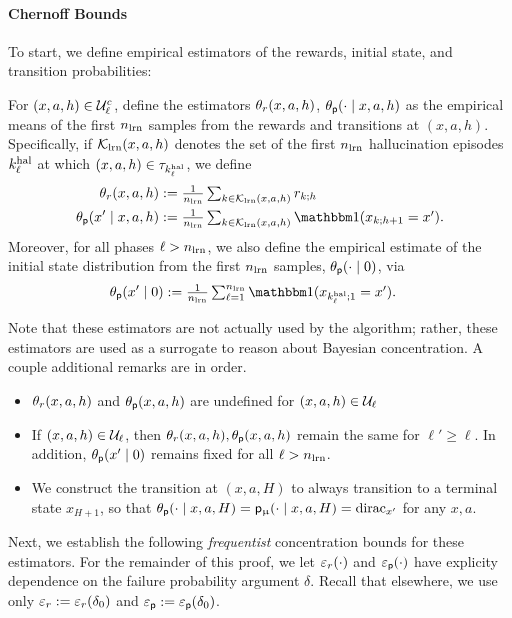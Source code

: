 \paragraph{Chernoff Bounds} To start, we define empirical estimators of the rewards, initial state, and transition probabilities:
\begin{definition}\label{defn:estimators} For $(x,a,h) \in \mathcal{U}_{\ell}^c$, define the estimators $\theta_r(x,a,h)$, $\theta_{\mathsf{p}}(\cdot \mid x,a,h)$  as the empirical means of the first $n_{\mathrm{lrn}}$ samples from the rewards and transitions at $(x,a,h)$. Specifically, if $\mathcal{K}_{\mathrm{lrn}}(x,a,h)$ denotes the set of the first $n_{\mathrm{lrn}}$ hallucination episodes $k^{\mathrm{hal}}_{\ell}$ at which $(x,a,h) \in \tau_{k^{\mathrm{hal}}_{\ell}}$, we define
\begin{align*}
\thetar(x,a,h) &:= \textstyle\frac{1}{\nlearn}\sum_{k \in \Klearn(x,a,h)} r_{k;h}\\
\thetap(x' \mid x,a,h) &:= \textstyle\frac{1}{\nlearn}\sum_{k \in \Klearn(x,a,h)} \ind(x_{k;h+1} = x').
\end{align*}
Moreover, for all phases $\ell > n_{\mathrm{lrn}}$, we also define the empirical estimate of the initial state distribution from the first $n_{\mathrm{lrn}}$ samples, $\theta_{\mathsf{p}}(\cdot \mid 0)$, via
\begin{align*}
\thetap(x' \mid 0) &:= \textstyle\frac{1}{\nlearn}\sum_{\ell = 1}^{\nlearn} \ind(x_{\kexpl;1} = x').
\end{align*}
\end{definition}
Note that these estimators are not actually used by the algorithm; rather, these estimators are used as a surrogate to reason about Bayesian concentration. A couple additional remarks are in order.
\begin{itemize}
	\item $\theta_r(x,a,h)$ and $\theta_{\mathsf{p}}(x,a,h)$ are undefined for $(x,a,h) \in \mathcal{U}_{\ell}$
	\item If $(x,a,h) \in \mathcal{U}_{\ell}$, then $\theta_r(x,a,h),\theta_{\mathsf{p}}(x,a,h)$ remain the same for $\ell' \ge \ell$. In addition, $\theta_{\mathsf{p}}(x'\mid 0)$ remains fixed for all $\ell > n_{\mathrm{lrn}}$.
	\item We construct the transition at $(x,a,H)$ to always transition to a terminal state $x_{H+1}$, so that $\theta_{\mathsf{p}}(\cdot\mid x,a,H) = \mathsf{p}_{\upmu}(\cdot \mid x,a,H) = \mathrm{dirac}_{x'}$ for any $x,a$.
\end{itemize}
Next, we establish the following \emph{frequentist}  concentration bounds for these estimators. For the remainder of this proof, we let $\varepsilon_{r}(\cdot)$ and $\varepsilon_{\mathsf{p}}(\cdot)$ have explicity dependence on the failure probability argument $\delta$. Recall that elsewhere, we use only $\varepsilon_{r} := \varepsilon_{r}(\delta_0)$ and $\varepsilon_{\mathsf{p}} := \varepsilon_{\mathsf{p}}(\delta_0)$.
